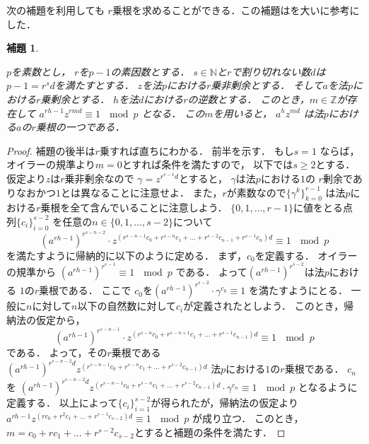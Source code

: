 \documentclass[leqno]{jsarticle}
\newtheorem{lem}[thm]{補題}
\newcommand{\nn}{\mathbb{N}}
\newcommand{\zz}{\mathbb{Z}}
\begin{document}
次の補題を利用しても
$r$乗根を求めることができる．この補題は\cite{1}を大いに参考にした．
\begin{lem}\label{lem:k2}

$p$を素数とし，
$r$を$p-1$の素因数とする．
$s\in \nn$と$r$で割り切れない数$d$は
$p-1=r^{s}d$を満たすとする．
$z$を法$p$における$r$乗非剰余とする．
そして$a$を法$p$における$r$乗剰余とする．
$h$を法$d$における$r$の逆数とする．
このとき，$m\in \zz$が存在して
$a^{rh-1}z^{rmd}\equiv 1\ \mod p$
となる．
この$m$を用いると，
$a^{h}z^{md}$
は法$p$における$a$の$r$乗根の一つである．
\end{lem}
\begin{proof}
補題の後半は$r$乗すれば直ちにわかる．
前半を示す．
もし$s=1$
ならば，オイラーの規準より$m=0$とすれば条件を満たすので，
以下では$s\ge 2$とする．
仮定より$z$は$r$乗非剰余なので
$\gamma=z^{r^{s-1}d}$とすると，
$\gamma$は法$p$における$1$の
$r$剰余でありなおかつ$1$とは異なることに注意せよ．
また，$r$が素数なので$\{\gamma^k\}_{k=0}^{r-1}$
は法$p$における$r$乗根を全て含んでいることに注意しよう．
$\{0, 1, \dots, r-1\}$に値をとる点列$\{c_i\}_{i=0}^{s-2}$
を任意の$n\in \{0, 1, \dots, s-2\}$について
\[
\left(a^{rh-1}\right)^{r^{s-n-2}}
\cdot 
z^{(r^{s-n-1}c_0+r^{s-n}c_1+\dots+ r^{s-2}c_{n-1}+r^{s-1}c_n)d}
\equiv 
1\ 
\mod p
\]
を満たすように帰納的に以下のように定める．
まず，$c_0$を定義する．
オイラーの規準から
$\left(a^{rh-1}\right)^{r^{s-1}}\equiv 1\ \mod p$
である．
よって$\left(a^{rh-1}\right)^{r^{s-2}}$は法$p$における
$1$の$r$乗根である．
ここで
$c_0$を$\left(a^{rh-1}\right)^{r^{s-2}}\cdot \gamma^{c_0}\equiv 1$
を満たすようにとる．
一般に$n$に対して$n$以下の自然数に対して$c_{i}$が定義されたとしよう．
このとき，帰納法の仮定から，
\[
\left(a^{rh-1}\right)^{r^{s-n-1}}
\cdot z^{(r^{s-n}c_0+r^{s-n+1}c_1+\dots+ r^{s-1}c_{n-1})d}
\equiv 
1\ 
\mod p
\]
である．
よって，その$r$乗根である
$\left(a^{rh-1}\right)^{r^{s-n-2}d}
z^{(r^{s-n-1}c_0+r^{s-n}c_1+\dots+ r^{s-2}c_{n-1})d}$
法$p$における$1$の$r$乗根である．
$c_n$を
$\left(a^{rh-1}\right)^{r^{s-n-2}d}
z^{(r^{s-n-1}c_0+r^{s-n}c_1+\dots+ r^{s-2}c_{n-1})d}
\cdot \gamma^{c_n}
\equiv 1\ \mod p$
となるように定義する．
以上によって$\{c_i\}_{i=1}^{s-2}$が得られたが，帰納法の仮定より
$a^{rh-1}z^{(rc_0+r^{2}c_1+\dots+ r^{s-1}c_{s-2})d}\equiv 1\ \mod p$
が成り立つ．
このとき，
$m=c_0+rc_1+\dots+r^{s-2}c_{s-2}$とすると補題の条件を満たす．
\end{proof}
\end{document}
